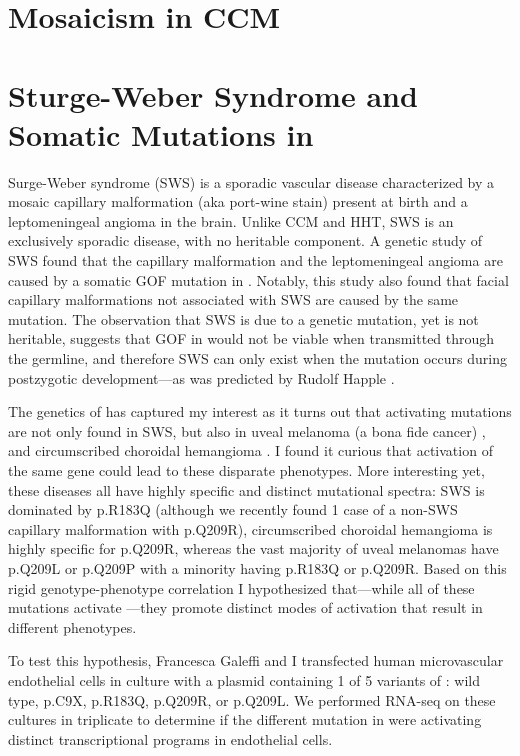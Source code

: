 \section{Mosaicism in CCM}



\section{Sturge-Weber Syndrome and Somatic Mutations in }
Surge-Weber syndrome (SWS) is a sporadic vascular disease characterized by a mosaic capillary malformation (aka port-wine stain) present at birth and a leptomeningeal angioma in the brain. Unlike CCM and HHT, SWS is an exclusively sporadic disease, with no heritable component. A genetic study of SWS found that the capillary malformation and the leptomeningeal angioma are caused by a somatic GOF mutation in  \citep{shirley2013}. Notably, this study also found that facial capillary malformations not associated with SWS are caused by the same mutation. The observation that SWS is due to a genetic mutation, yet is not heritable, suggests that GOF in  would not be viable when transmitted through the germline, and therefore SWS can only exist when the mutation occurs during postzygotic development---as was predicted by Rudolf Happle \citep{happle1987}.

The genetics of  has captured my interest as it turns out that activating mutations are not only found in SWS, but also in uveal melanoma (a bona fide cancer) \citep{shoushtari2014}, and circumscribed choroidal hemangioma \citep{leguin2019}. I found it curious that activation of the same gene could lead to these disparate phenotypes. More interesting yet, these diseases all have highly specific and distinct  mutational spectra: SWS is dominated by p.R183Q (although we recently found 1 case of a non-SWS capillary malformation with p.Q209R), circumscribed choroidal hemangioma is highly specific for p.Q209R, whereas the vast majority of uveal melanomas have p.Q209L or p.Q209P with a minority having p.R183Q or p.Q209R. Based on this rigid genotype-phenotype correlation I hypothesized that---while all of these mutations activate ---they promote distinct modes of activation that result in different phenotypes. 

To test this hypothesis, Francesca Galeffi and I transfected human microvascular endothelial cells in culture with a plasmid containing 1 of 5 variants of : wild type, p.C9X, p.R183Q, p.Q209R, or p.Q209L. We performed RNA-seq on these cultures in triplicate to determine if the different mutation in  were activating distinct transcriptional programs in endothelial cells. 

